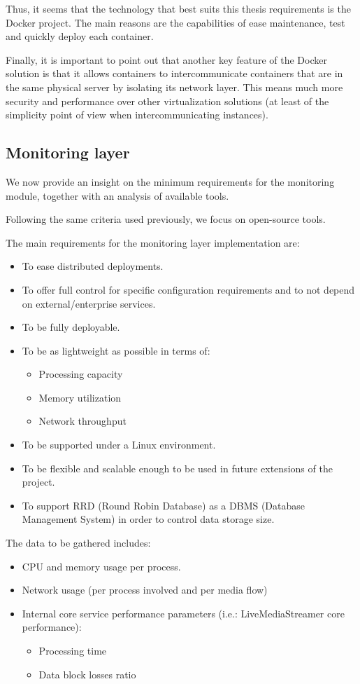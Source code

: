 Thus, it seems that the technology that best suits this thesis requirements is the Docker project. The main reasons are the capabilities of ease maintenance, test and quickly deploy each container. 

Finally, it is important to point out that another key feature of the Docker solution is that it allows containers to intercommunicate containers that are in the same physical server by isolating its network layer. This means much more security and performance over other virtualization solutions (at least of the simplicity point of view when intercommunicating instances).

\subsection{Monitoring layer}

We now provide an insight on the minimum requirements for the monitoring module, together with an analysis of available tools.

Following the same criteria used previously, we focus on open-source tools.

The main requirements for the monitoring layer implementation are:

\begin{itemize}
\item To ease distributed deployments.
\item To offer full control for specific configuration requirements and to not depend on external/enterprise services. 
\item To be fully deployable.
\item To be as lightweight as possible in terms of:
\begin{itemize}
\item Processing capacity
\item Memory utilization
\item Network throughput
\end{itemize}
\item To be supported under a Linux environment.
\item To be flexible and scalable enough to be used in future extensions of the project.
\item To support RRD (Round Robin Database) as a DBMS (Database Management System) in order to control data storage size.
\end{itemize}

The data to be gathered includes:

\begin{itemize}
\item CPU and memory usage per process.
\item Network usage (per process involved and per media flow)
\item Internal core service performance parameters (i.e.: LiveMediaStreamer core performance):
\begin{itemize}
\item Processing time
\item Data block losses ratio
\end{itemize}
\end{itemize}

